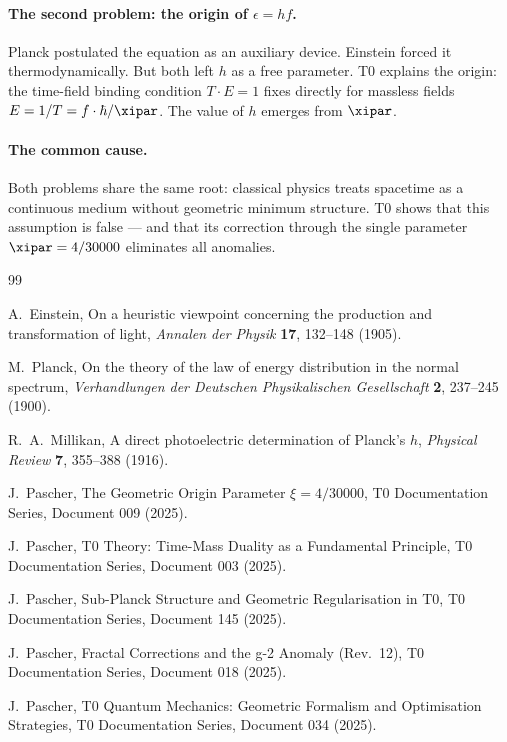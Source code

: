 \paragraph{The second problem: the origin of $\epsilon = hf$.}
Planck postulated the equation as an auxiliary device. Einstein forced it 
thermodynamically. But both left $h$ as a free parameter. T0 explains the origin: 
the time-field binding condition $T \cdot E = 1$ fixes directly for massless fields 
$E = 1/T = f \cdot \hbar / \xipar$. The value of $h$ emerges from $\xipar$.

\paragraph{The common cause.}
Both problems share the same root: classical physics treats spacetime as a 
continuous medium without geometric minimum structure. T0 shows that this assumption 
is false — and that its correction through the single parameter $\xipar = 4/30000$ 
eliminates all anomalies.

\begin{thebibliography}{99}

A.~Einstein,
\newblock On a heuristic viewpoint concerning the production and transformation 
of light,
\newblock \emph{Annalen der Physik} \textbf{17}, 132–148 (1905).

M.~Planck,
\newblock On the theory of the law of energy distribution in the normal spectrum,
\newblock \emph{Verhandlungen der Deutschen Physikalischen Gesellschaft} \textbf{2}, 
237–245 (1900).

R.~A.~Millikan,
\newblock A direct photoelectric determination of Planck's $h$,
\newblock \emph{Physical Review} \textbf{7}, 355–388 (1916).

J.~Pascher,
\newblock The Geometric Origin Parameter $\xi = 4/30000$,
\newblock T0 Documentation Series, Document 009 (2025).

J.~Pascher,
\newblock T0 Theory: Time-Mass Duality as a Fundamental Principle,
\newblock T0 Documentation Series, Document 003 (2025).

J.~Pascher,
\newblock Sub-Planck Structure and Geometric Regularisation in T0,
\newblock T0 Documentation Series, Document 145 (2025).

J.~Pascher,
\newblock Fractal Corrections and the g-2 Anomaly (Rev.\ 12),
\newblock T0 Documentation Series, Document 018 (2025).

J.~Pascher,
\newblock T0 Quantum Mechanics: Geometric Formalism and Optimisation Strategies,
\newblock T0 Documentation Series, Document 034 (2025).

\end{thebibliography}
